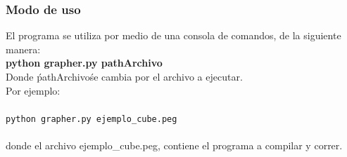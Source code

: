 

\newpage
\subsubsection{Modo de uso}
El programa se utiliza por medio de una consola de comandos, de la siguiente manera:\\
\textbf{ python grapher.py pathArchivo} \\ 
Donde \'pathArchivo\' se cambia por el archivo a ejecutar.
\\
Por ejemplo:\\
\\
\texttt{python grapher.py ejemplo\_cube.peg}
\\
\\
donde el archivo ejemplo\_cube.peg, contiene el programa a compilar y correr.
